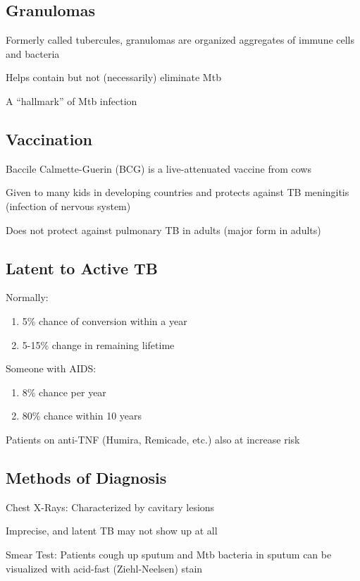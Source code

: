 \documentclass{notes}
\begin{document}
\subsection*{Granulomas}
Formerly called tubercules, granulomas are organized aggregates of immune cells and bacteria

\tab \indicates Helps contain but not (necessarily) eliminate Mtb

A ``hallmark'' of Mtb infection

\subsection*{Vaccination}
Baccile Calmette-Guerin (BCG) is a live-attenuated vaccine from cows

Given to many kids in developing countries and protects against TB meningitis (infection of nervous system)

Does not protect against pulmonary TB in adults (major form in adults)

\subsection*{Latent to Active TB}

Normally:
\begin{enumerate}
    \item 5\% chance of conversion within a year
    \item 5-15\% change in remaining lifetime
\end{enumerate}

Someone with AIDS:
\begin{enumerate}
    \item 8\% chance per year
    \item 80\% chance within 10 years
\end{enumerate}

Patients on anti-TNF (Humira, Remicade, etc.) also at increase risk

\subsection*{Methods of Diagnosis}
Chest X-Rays: Characterized by cavitary lesions

\tab \indicates Imprecise, and latent TB may not show up at all

Smear Test: Patients cough up sputum and Mtb bacteria in sputum can be visualized with acid-fast (Ziehl-Neelsen) stain
\end{document}
